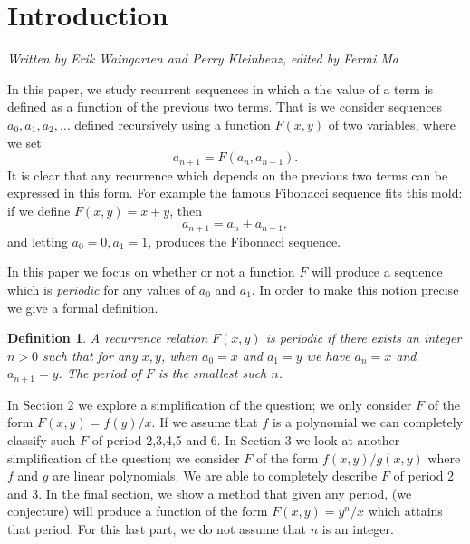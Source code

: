 \documentclass[12pt]{article}
\newtheorem{definition}{Definition}
\begin{document}
\maketitle

\section{Introduction}
\emph{Written by Erik Waingarten and Perry Kleinhenz, edited by Fermi Ma}

In this paper, we study recurrent sequences in which a the value of a term is defined as a function of the previous two terms. That is we consider sequences $a_0, a_1, a_2, \dots$ defined recursively using a function $F(x,y)$ of two variables, where we set
\begin{equation*}
a_{n+1} = F(a_n, a_{n-1}).
\end{equation*}
It is clear that any recurrence which depends on the previous two terms can be expressed in this form. For example the famous Fibonacci sequence fits this mold: if we define $F(x,y) = x + y$, then 
\begin{equation*}
a_{n+1} = a_n + a_{n-1},
\end{equation*}
and letting $a_0 =0 , a_1 = 1$, produces the Fibonacci sequence. 

In this paper we focus on whether or not a function $F$ will produce a sequence which is \emph{periodic} for any values of $a_0$ and $a_1$. In order to make this notion precise we give a formal definition.
\begin{definition}
A recurrence relation $F(x,y)$ is \textit{periodic} if  there exists an integer $n>0$ such that for any $x,y$, when $a_0 = x$ and $a_1 = y$ we have $a_n = x$ and $a_{n+1} = y$. The \emph{period} of $F$ is the smallest such $n$. 
\end{definition}


In Section 2 we explore a simplification of the question; we only consider $F$ of the form $F(x,y)=f(y)/x$. If we assume that $f$ is a polynomial we can completely classify such $F$ of period 2,3,4,5 and 6. In Section 3 we look at another simplification of the question; we consider $F$ of the form $f(x,y)/g(x,y)$ where $f$ and $g$ are linear polynomials. We are able to completely describe $F$ of period 2 and 3. In the final section, we show a method that given any period, (we conjecture) will produce a function of the form $F(x,y) = y^n/x$ which attains that period. For this last part, we do not assume that $n$ is an integer.
\end{document}
